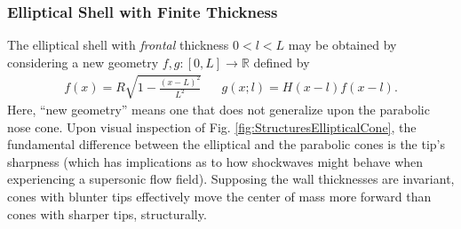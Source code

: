 \documentclass[11pt,dvipsnames]{thesis}
\begin{document}
\subsubsection{Elliptical Shell with Finite Thickness}
The elliptical shell with \textit{frontal} thickness $0 < l < L$ may be obtained by considering a new geometry $f, g : [0, L] \to \mathbb{R}$ defined by
\begin{align}
f(x) = R \sqrt{1 - \frac{(x - L)^2}{L^2}} && g(x; l) = H(x - l) f(x - l).
\end{align}
Here, ``new geometry'' means one that does not generalize upon the parabolic nose cone. 
Upon visual inspection of Fig. \ref{fig:StructuresEllipticalCone}, the fundamental difference between the elliptical and the parabolic cones is the tip's sharpness (which has implications as to how shockwaves might behave when experiencing a supersonic flow field). 
Supposing the wall thicknesses are invariant, cones with blunter tips effectively move the center of mass more forward than cones with sharper tips, structurally.
\end{document}
